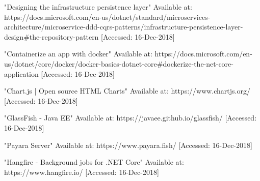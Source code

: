  "Designing the infrastructure persistence layer" Available at: https://docs.microsoft.com/en-us/dotnet/standard/microservices-architecture/microservice-ddd-cqrs-patterns/infrastructure-persistence-layer-design\#the-repository-pattern [Accessed: 16-Dec-2018]

 "Containerize an app with docker" Available at: https://docs.microsoft.com/en-us/dotnet/core/docker/docker-basics-dotnet-core\#dockerize-the-net-core-application [Accessed: 16-Dec-2018]

 "Chart.js | Open source HTML Charts" Available at: https://www.chartjs.org/ [Accessed: 16-Dec-2018]

 "GlassFish - Java EE" Available at: https://javaee.github.io/glassfish/ [Accessed: 16-Dec-2018]

 "Payara Server" Available at: https://www.payara.fish/ [Accessed: 16-Dec-2018]

 "Hangfire - Background jobs for .NET Core" Available at: https://www.hangfire.io/ [Accessed: 16-Dec-2018]